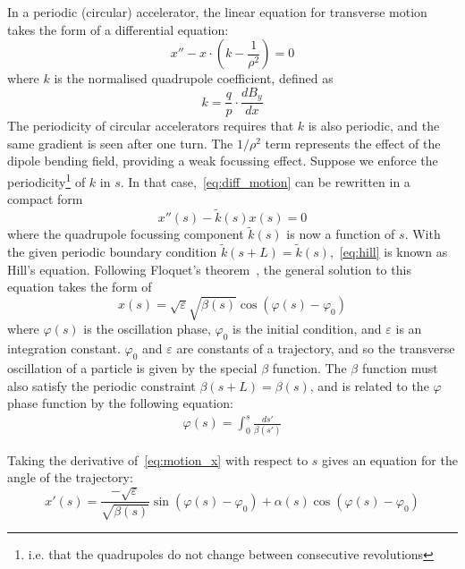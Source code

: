 \documentclass[a4paper,twoside,11pt]{report}
\begin{document}
In a periodic (circular) accelerator, the linear equation for transverse motion takes the form of a differential equation:
\begin{equation}
  x''-x\cdot\left(k-\frac{1}{\rho^2}\right)=0
  \label{eq:diff_motion}
\end{equation} 
where $k$ is the normalised quadrupole coefficient, defined as
\begin{equation}
  k=\frac{q}{p}\cdot\frac{dB_y}{dx}
  \label{eq:quadrupole}
\end{equation}
The periodicity of circular accelerators requires that $k$ is also periodic, and the same gradient is seen after one turn. The $1/\rho^2$ term represents the effect of the dipole bending field, providing a weak focussing effect. Suppose we enforce the periodicity\footnote{i.e. that the quadrupoles do not change between consecutive revolutions} of $k$ in $s$. In that case,~\autoref{eq:diff_motion} can be rewritten in a compact form
\begin{equation}
  x''(s)-\tilde{k}(s)x(s)=0
  \label{eq:hill}
\end{equation} where the quadrupole focussing component $\tilde{k}(s)$ is now a function of $s$. With the given periodic boundary condition $\tilde k(s+L)=\tilde{k}(s)$,~\ref{eq:hill} is known as Hill's equation. 
Following Floquet's theorem~\cite{Rossbach:247501}, the general solution to this equation takes the form of
\begin{equation}
x(s) =\sqrt{\varepsilon}\sqrt{\beta(s)}\cos(\varphi(s)-\varphi_0)
\label{eq:motion_x}
\end{equation} 
where $\varphi(s)$ is the oscillation phase, $\varphi_0$ is the initial condition, and $\varepsilon$ is an integration constant. $\varphi_0$ and $\varepsilon$ are constants of a trajectory, and so the transverse oscillation of a particle is given by the special $\beta$ function. The $\beta$ function must also satisfy the periodic constraint $\beta(s+L)=\beta(s)$, and is related to the $\varphi$ phase function by the following equation:
\begin{eqnarray}
  \varphi(s) = \int^s_0\frac{ds'}{\beta(s')}
  \label{eq:phase_and_beta}
\end{eqnarray}

Taking the derivative of~\eqref{eq:motion_x} with respect to $s$ gives an equation for the angle of the trajectory:
\begin{equation}
x'(s)=\frac{-\sqrt\varepsilon}{\sqrt{\beta(s)}}\sin(\varphi(s)-\varphi_0)+\alpha(s)\cos(\varphi(s)-\varphi_0)
\label{eq:motion_px}
\end{equation}
\end{document}
